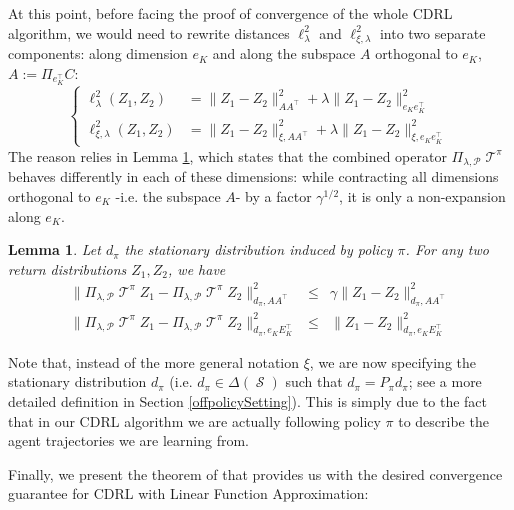 \documentclass[12pt,a4paper,openright,twoside]{article}
\DeclareMathOperator*{\Sspace}{\mathcal{S}}
\DeclareMathOperator*{\T}{\mathcal{T}}
\numberwithin{equation}{section}
\newtheorem{lemma}[theorem]{Lemma}
\theoremstyle{definition}
\theoremstyle{remark}
\theoremstyle{plain}
\begin{document}
 At this point, before facing the proof of convergence of the whole CDRL algorithm, we would need to rewrite distances $\ell^2_\lambda$ and $\ell^2_{\xi,\lambda}$ into two separate components: along dimension $e_K$ and along the subspace $A$ orthogonal to $e_K$, $A:= \Pi_{e_K^\top}C$:
\begin{equation}
	\left\{
	\begin{array}{ll}
		\ell_{\lambda}^2(Z_1,Z_2) &= \| Z_1 - Z_2 \|^2_{AA^\top} + \lambda \| Z_1 - Z_2 \|^2_{e_K e_K^\top}  \\
		\ell_{\xi,\lambda}^2(Z_1,Z_2) &= \| Z_1 - Z_2 \|^2_{\xi,AA^\top} + \lambda \| Z_1 - Z_2 \|^2_{\xi, e_K e_K^\top} 
	\end{array}
	\right.
\end{equation}
The reason relies in Lemma \ref{linearBellmanContraction}, which states that the combined operator $\Pi_{\lambda,\mathcal{P}} \T^\pi$ behaves differently in each of these dimensions: while contracting all dimensions orthogonal to $e_K$ -i.e. the subspace $A$- by a factor $\gamma^{1/2}$, it is only a non-expansion along $e_K$. 

\begin{lemma} \label{linearBellmanContraction}
	Let $d_\pi$ the stationary distribution induced by policy $\pi$. For any two return distributions $Z_1,Z_2$, we have
	\begin{equation*}
		\begin{array}{rcl}
			\| \Pi_{\lambda,\mathcal{P}} \T^\pi Z_1 - \Pi_{\lambda,\mathcal{P}} \T^\pi Z_2 \|^2_{d_\pi, AA^\top} & \leq & \gamma \| Z_1 - Z_2 \|^2_{d_\pi, AA^\top} \\
			\| \Pi_{\lambda,\mathcal{P}} \T^\pi Z_1 - \Pi_{\lambda,\mathcal{P}} \T^\pi Z_2 \|^2_{d_\pi, e_KE_K^\top} & \leq & \| Z_1 - Z_2 \|^2_{d_\pi, e_KE_K^\top}
		\end{array}
	\end{equation*}
\end{lemma}

Note that, instead of the more general notation $\xi$, we are now specifying the stationary distribution $d_\pi$ (i.e. $d_\pi \in \Delta(\Sspace)$ such that $d_\pi = P_\pi d_\pi$; see a more detailed definition in Section \ref{offpolicySetting}). This is simply due to the fact that in our CDRL algorithm we are actually following policy $\pi$ to describe the agent trajectories we are learning from.

Finally, we present the theorem of \cite{DRLlinear} that provides us with the desired convergence guarantee for CDRL with Linear Function Approximation:
\end{document}
